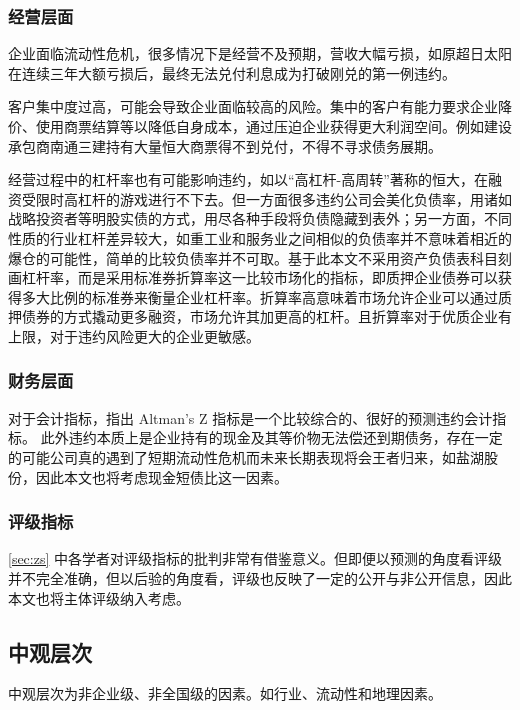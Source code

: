 \subsubsection{经营层面}
企业面临流动性危机，很多情况下是经营不及预期，营收大幅亏损，如原超日太阳在连续三年大额亏损后，最终无法兑付利息成为打破刚兑的第一例违约。

客户集中度过高，可能会导致企业面临较高的风险\cite{王雄元2017客户集中度与公司债二级市场信用利差}。集中的客户有能力要求企业降价、使用商票结算等以降低自身成本，通过压迫企业获得更大利润空间。例如建设承包商南通三建持有大量恒大商票得不到兑付，不得不寻求债务展期。

经营过程中的杠杆率也有可能影响违约\cite{王永钦2019杠杆率如何影响资产价格}，如以“高杠杆-高周转”著称的恒大，在融资受限时高杠杆的游戏进行不下去。但一方面很多违约公司会美化负债率，用诸如战略投资者等明股实债的方式，用尽各种手段将负债隐藏到表外；另一方面，不同性质的行业杠杆差异较大，如重工业和服务业之间相似的负债率并不意味着相近的爆仓的可能性，简单的比较负债率并不可取。基于此本文不采用资产负债表科目刻画杠杆率，而是采用标准券折算率这一比较市场化的指标，即质押企业债券可以获得多大比例的标准券来衡量企业杠杆率。折算率高意味着市场允许企业可以通过质押债券的方式撬动更多融资，市场允许其加更高的杠杆。且折算率对于优质企业有上限，对于违约风险更大的企业更敏感。

\subsubsection{财务层面}
对于会计指标，\Textcite{blochlinger2018ratings}指出 Altman's Z 指标是一个比较综合的、很好的预测违约会计指标。
此外违约本质上是企业持有的现金及其等价物无法偿还到期债务，存在一定的可能公司真的遇到了短期流动性危机而未来长期表现将会王者归来，如盐湖股份，因此本文也将考虑现金短债比这一因素。
\subsubsection{评级指标}
\ref{sec:zs} 中各学者对评级指标的批判非常有借鉴意义。但即便以预测的角度看评级并不完全准确，但以后验的角度看，评级也反映了一定的公开与非公开信息，因此本文也将主体评级纳入考虑。
\subsection{中观层次}
中观层次为非企业级、非全国级的因素。如行业、流动性和地理因素。

